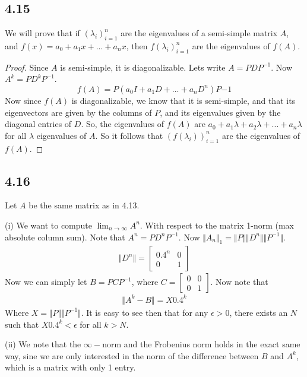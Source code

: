 \documentclass{article}
\begin{document}
	\subsection*{4.15}
	We will prove that if $(\lambda_i)_{i=1}^{n}$ are the eigenvalues of a semi-simple matrix $A$, and $f(x) = a_0 + a_1 x + ... + a_n x$, then $f(\lambda_i)_{i=1}^{n}$ are the eigenvalues of $f(A)$.
	\begin{proof}
	Since $A$ is semi-simple, it is diagonalizable. Lets write $A = P D P^{-1}$. Now $A^k = P D^k P^{-1}$. 
	\[ f(A) = P(a_0 I + a_1 D + ... +a_n D^n)P{-1} \]
	Now since $f(A)$ is diagonalizable, we know that it is semi-simple, and that its eigenvectors are given by the columns of $P$, and its eigenvalues given by the diagonal entries of $D$. So, the eigenvalues of $f(A)$ are $a_0 + a_1 \lambda + a_2 \lambda + ... + a_n \lambda$ for all $\lambda$ eigenvalues of $A$. So it follows that $(f(\lambda_i))_{i=1}^{n}$ are the eigenvalues of $f(A)$.
	\end{proof}

	\subsection*{4.16}
	Let $A$ be the same matrix as in 4.13. 
	
	(i) We want to compute $\lim_{n \to \infty} A^n$. With respect to the matrix 1-norm (max absolute column sum). Note that $A^n = P D^n P^{-1}$. Now $\Vert A_n \Vert_1 = \Vert P \Vert \Vert D^n \Vert \Vert P^{-1} \Vert$. 
	\begin{align*}
	\Vert D^n \Vert = \begin{bmatrix} 0.4^n & 0 \\ 0 & 1 \end{bmatrix}
	\end{align*}
	Now we can simply let $B = P C P^{-1}$, where $C = \begin{bmatrix} 0 & 0 \\ 0 & 1 \end{bmatrix}$. Now note that 
	\begin{align*}
	\Vert A^k - B \Vert = X 0.4^k 
	\end{align*}
	Where $X = \Vert P \Vert \Vert P^{-1} \Vert$. It is easy to see then that for any $\epsilon > 0$, there exists an $N$ such that $ X 0.4^k < \epsilon$ for all $k > N$. 
	
	(ii) We note that the $\infty-$norm and the Frobenius norm holds in the exact same way, sine we are only interested in the norm of the difference between $B$ and $A^k$, which is a matrix with only 1 entry.
	
\end{document}
